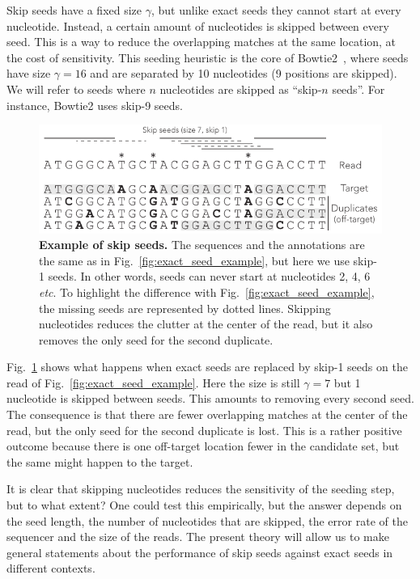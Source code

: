 \documentclass{article}
\begin{document}
Skip seeds have a fixed size $\gamma$, but unlike exact seeds they cannot
start at every nucleotide. Instead, a certain amount of nucleotides is
skipped between every seed. This is a way to reduce the overlapping
matches at the same location, at the cost of sensitivity. This seeding
heuristic is the core of Bowtie2~\cite{pmid22388286}, where seeds have
size $\gamma=16$ and are separated by 10 nucleotides (9 positions are
skipped). We will refer to seeds where $n$ nucleotides are skipped as
``skip-$n$ seeds''. For instance, Bowtie2 uses skip-9 seeds.

\begin{figure}[h]
\centering
\includegraphics[scale=1]{skip_seed_example.pdf}
\caption{\textbf{Example of skip seeds.}
The sequences and the annotations are the same as in
Fig.~\ref{fig:exact_seed_example}, but here we use skip-1 seeds. In other
words, seeds can never start at nucleotides 2, 4, 6 \textit{etc}. To
highlight the difference with Fig.~\ref{fig:exact_seed_example}, the
missing seeds are represented by dotted lines. Skipping nucleotides
reduces the clutter at the center of the read, but it also removes the
only seed for the second duplicate.}
\label{fig:skip_seed_example}
\end{figure}

Fig.~\ref{fig:skip_seed_example} shows what happens when exact seeds are
replaced by skip-1 seeds on the read of Fig.~\ref{fig:exact_seed_example}.
Here the size is still $\gamma=7$ but 1 nucleotide is skipped between
seeds. This amounts to removing every second seed. The consequence is that
there are fewer overlapping matches at the center of the read, but the
only seed for the second duplicate is lost. This is a rather positive
outcome because there is one off-target location fewer in the candidate
set, but the same might happen to the target.

It is clear that skipping nucleotides reduces the sensitivity of the
seeding step, but to what extent? One could test this empirically, but the
answer depends on the seed length, the number of nucleotides that are
skipped, the error rate of the sequencer and the size of the reads. The
present theory will allow us to make general statements about the
performance of skip seeds against exact seeds in different contexts.
\end{document}
